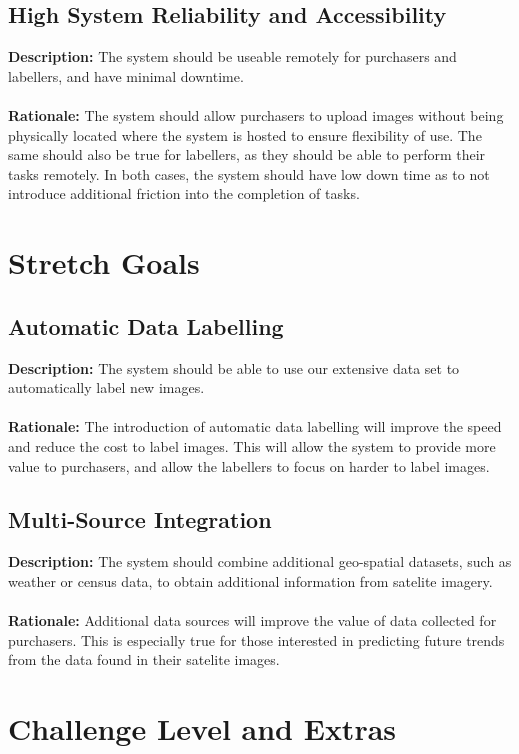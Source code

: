 \documentclass{article}
\begin{document}
\subsection{High System Reliability and Accessibility}
\textbf{Description: }The system should be useable remotely for purchasers and labellers, and have minimal downtime. \\\\
\textbf{Rationale: }The system should allow purchasers to upload images without being physically located where the system is hosted to ensure flexibility of use. The same should also be true for labellers, as they 
should be able to perform their tasks remotely. In both cases, the system should have low down time as to not introduce additional friction into the completion of tasks.

\section{Stretch Goals}
\subsection{Automatic Data Labelling}
\textbf{Description: }The system should be able to use our extensive data set to automatically label new images. \\\\
\textbf{Rationale: }The introduction of automatic data labelling will improve the speed and reduce the cost to label images. This will allow the system to provide more value to 
purchasers, and allow the labellers to focus on harder to label images.
\subsection{Multi-Source Integration}
\textbf{Description: }The system should combine additional geo-spatial datasets, such as weather or census data, to obtain additional information from satelite imagery. \\\\
\textbf{Rationale: }Additional data sources will improve the value of data collected for purchasers. This is especially true for those interested in predicting future trends from the 
data found in their satelite images.



\section{Challenge Level and Extras}
\end{document}
